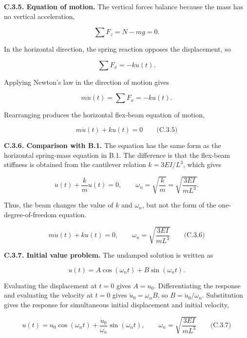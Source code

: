\textbf{C.3.5. Equation of motion.} The vertical forces balance because the mass has no vertical acceleration,

\[
\sum F_z=N-mg=0.
\]

In the horizontal direction, the spring reaction opposes the displacement, so

\[
\sum F_x=-ku(t).
\]

Applying Newton's law in the direction of motion gives

\[
m\ddot{u}(t)=\sum F_x=-ku(t).
\]

Rearranging produces the horizontal flex-beam equation of motion,

\[
\boxed{m\ddot{u}(t)+ku(t)=0}
\qquad\text{(C.3.5)}
\]

\textbf{C.3.6. Comparison with B.1.} The equation has the same form as the horizontal spring-mass equation in B.1. The difference is that the flex-beam stiffness is obtained from the cantilever relation \(k=3EI/L^3\), which gives

\[
\ddot{u}(t)+\frac{k}{m}u(t)=0,
\qquad
\omega_n=\sqrt{\frac{k}{m}}
 =\sqrt{\frac{3EI}{mL^3}}.
\]

Thus, the beam changes the value of \(k\) and \(\omega_n\), but not the form of the one-degree-of-freedom equation.

\[
\boxed{m\ddot{u}(t)+ku(t)=0,
\qquad \omega_n=\sqrt{\frac{3EI}{mL^3}}}
\qquad\text{(C.3.6)}
\]

\textbf{C.3.7. Initial value problem.} The undamped solution is written as

\[
u(t)=A\cos(\omega_nt)+B\sin(\omega_nt).
\]

Evaluating the displacement at \(t=0\) gives \(A=u_0\). Differentiating the response and evaluating the velocity at \(t=0\) gives \(\dot{u}_0=\omega_nB\), so \(B=\dot{u}_0/\omega_n\). Substitution gives the response for simultaneous initial displacement and initial velocity,

\[
\boxed{u(t)=u_0\cos(\omega_nt)
 +\frac{\dot{u}_0}{\omega_n}\sin(\omega_nt),
\qquad \omega_n=\sqrt{\frac{3EI}{mL^3}}}
\qquad\text{(C.3.7)}
\]

\endgroup
